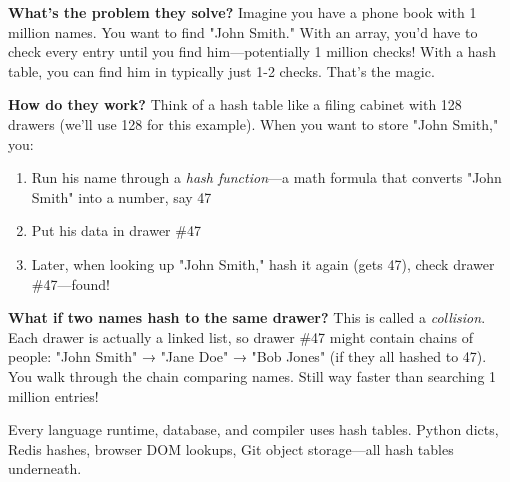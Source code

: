 \textbf{What's the problem they solve?} Imagine you have a phone book with 1 million names. You want to find "John Smith." With an array, you'd have to check every entry until you find him—potentially 1 million checks! With a hash table, you can find him in typically just 1-2 checks. That's the magic.

\textbf{How do they work?} Think of a hash table like a filing cabinet with 128 drawers (we'll use 128 for this example). When you want to store "John Smith," you:
\begin{enumerate}
    \item Run his name through a \textit{hash function}—a math formula that converts "John Smith" into a number, say 47
    \item Put his data in drawer \#47
    \item Later, when looking up "John Smith," hash it again (gets 47), check drawer \#47—found!
\end{enumerate}

\textbf{What if two names hash to the same drawer?} This is called a \textit{collision}. Each drawer is actually a linked list, so drawer \#47 might contain chains of people: "John Smith" → "Jane Doe" → "Bob Jones" (if they all hashed to 47). You walk through the chain comparing names. Still way faster than searching 1 million entries!

Every language runtime, database, and compiler uses hash tables. Python dicts, Redis hashes, browser DOM lookups, Git object storage—all hash tables underneath.

